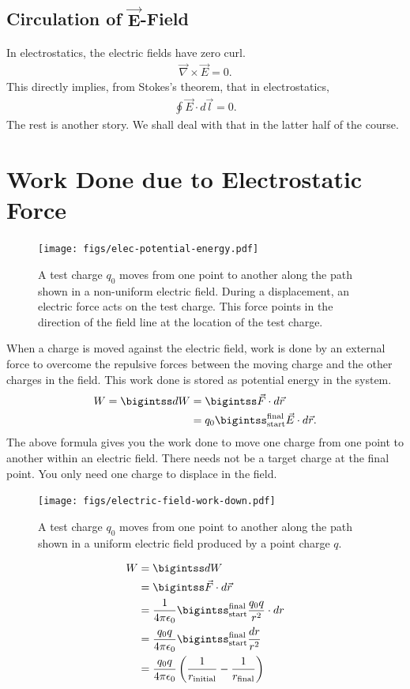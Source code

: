 \documentclass[12pt,b4paper]{article}
\begin{document}
\subsection*{Circulation of $\boldsymbol{\vec{E}}$-Field}
In electrostatics, the electric fields have zero curl.
\begin{align}
    \vec{\nabla}\times\vec{E}=0.
\end{align}
This directly implies, from Stokes's theorem, that in electrostatics,
\begin{align}
    \oint \vec{E}\cdot d\vec{l}=0.
\end{align}
The rest is another story. We shall deal with that in the latter half of the course.
\section{Work Done due to Electrostatic Force}
\begin{figure}[H]
    \centering
    \texttt{[image: figs/elec-potential-energy.pdf]}
    \caption{A test charge $q_0$ moves from one point to another along the path shown in a non-uniform electric field. During a displacement, an electric force acts on the test charge. This force points in the direction of the field line at the location of the test charge.}
    \label{fig:electric-potential-energy}
\end{figure}
When a charge is moved against the electric field, work is done by an external force to overcome the repulsive forces between the moving charge and the other charges in the field. This work done is stored as potential energy in the system.
\begin{align}
    W=\bigintss dW&=\bigintss\vec{F}\cdot d\vec{r}\notag\\
    &=q_0\bigintss_{\text{start}}^{\text{final}}\vec{E}\cdot d\vec{r}.
\end{align}
The above formula gives you the work done to move one charge from one point to another within an electric field. There needs not be a target charge at the final point. You only need one charge to displace in the field. 
\begin{figure}
    \centering
    \texttt{[image: figs/electric-field-work-down.pdf]}
    \caption{A test charge $q_0$ moves from one point to another along the path shown in a uniform electric field produced by a point charge $q$.}
    \label{fig:electric-potential-energy}
\end{figure}
\begin{align}
    W&=\bigintss dW\notag\\
    &=\bigintss\vec{F}\cdot d\vec{r}\notag\\
    &=\frac{1}{4\pi\epsilon_0}\bigintss_{\text{start}}^{\text{final}}\frac{q_0q}{r^2}\cdot dr\notag\\
    &=\frac{q_0q}{4\pi\epsilon_0}\bigintss_{\text{start}}^{\text{final}}\frac{dr}{r^2}\notag\\
    &=\frac{q_0q}{4\pi\epsilon_0}\left(\frac{1}{r_\text{initial}}-\frac{1}{r_\text{final}}\right)
\end{align}
\end{document}
